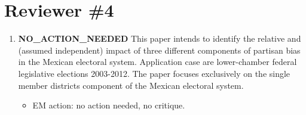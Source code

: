 \documentclass{article}
\begin{document}
\section{Reviewer \#4}
\label{sec:orgheadline31}
\begin{enumerate}
\item {\bfseries\sffamily NO\_ACTION\_NEEDED} This paper intends to identify the relative and (assumed independent) impact of three different components of partisan bias  in the Mexican electoral system. Application case are lower-chamber federal legislative elections 2003-2012. The paper focuses exclusively on the single member districts  component of the Mexican electoral system.
\label{sec:orgheadline21}
\begin{itemize}
\item EM action: no action needed, no critique.
\end{itemize}


\end{enumerate}
\end{document}
